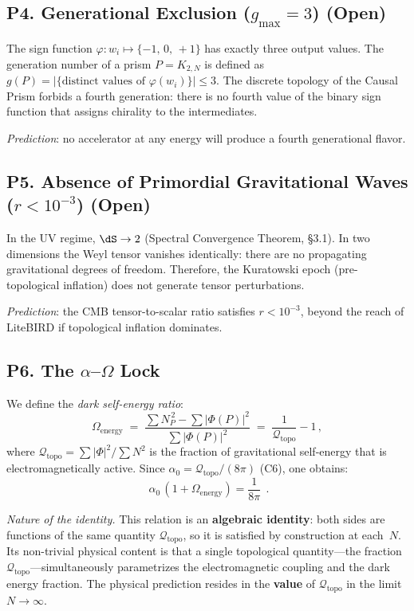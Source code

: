 \subsection*{P4. Generational Exclusion ($g_{\max} = 3$) (Open)}
\label{open:gen-exclusion}

The sign function $\varphi \colon w_i \mapsto \{-1,\,0,\,+1\}$ has
exactly three output values. The generation number of a
prism $P = K_{2,N}$ is defined as $g(P) = |\{\text{distinct
values of } \varphi(w_i)\}| \leq 3$. The discrete topology of the Causal Prism
forbids a fourth generation: there is no fourth value of the
binary sign function that assigns chirality to the intermediates.

\medskip\noindent
\textit{Prediction}: no accelerator at any energy
will produce a fourth generational flavor.

\subsection*{P5. Absence of Primordial Gravitational Waves
  ($r < 10^{-3}$) (Open)}
\label{open:no-tensor}

In the UV regime, $\dS \to 2$ (Spectral Convergence Theorem,
\S3.1). In two dimensions the Weyl tensor vanishes identically:
there are no propagating gravitational degrees of freedom. Therefore, the
Kuratowski epoch (pre-topological inflation) does not generate
tensor perturbations.

\medskip\noindent
\textit{Prediction}: the CMB tensor-to-scalar ratio satisfies
$r < 10^{-3}$, beyond the reach of LiteBIRD if topological
inflation dominates.

\subsection*{P6. The $\alpha$--$\Omega$ Lock}
\label{open:alpha-omega-lock}

We define the \emph{dark self-energy ratio}:
\[
  \Omega_{\mathrm{energy}}
  \;=\; \frac{\sum N_P^{\,2} - \sum|\Phi(P)|^2}{\sum|\Phi(P)|^2}
  \;=\; \frac{1}{\mathcal{Q}_{\mathrm{topo}}} - 1\,,
\]
where $\mathcal{Q}_{\mathrm{topo}} = \sum|\Phi|^2/\sum N^2$ is the
fraction of gravitational self-energy that is electromagnetically
active.  Since $\alpha_0 = \mathcal{Q}_{\mathrm{topo}}/(8\pi)$
(C6), one obtains:
\[
  \boxed{\;\alpha_0\,(1 + \Omega_{\mathrm{energy}}) = \frac{1}{8\pi}\;\,.}
\]

\medskip\noindent
\textit{Nature of the identity.}\enspace
This relation is an \textbf{algebraic identity}: both sides are
functions of the same quantity $\mathcal{Q}_{\mathrm{topo}}$, so
it is satisfied by construction at each~$N$. Its non-trivial physical
content is that a single topological quantity---the fraction
$\mathcal{Q}_{\mathrm{topo}}$---simultaneously parametrizes the
electromagnetic coupling and the dark energy fraction.
The physical prediction resides in the \textbf{value} of
$\mathcal{Q}_{\mathrm{topo}}$ in the limit $N \to \infty$.

